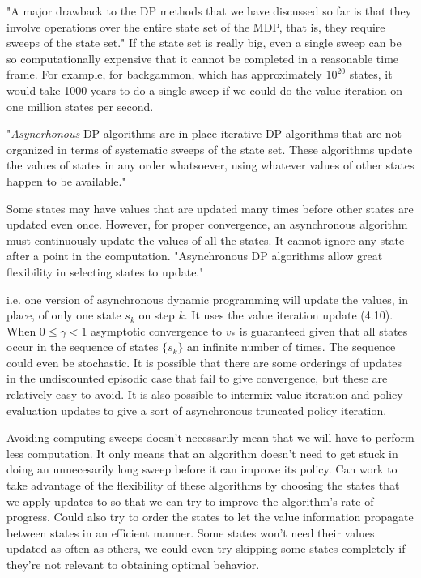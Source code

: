 \documentclass[11pt]{article}
\begin{document}
    "A major drawback to the DP methods that we have discussed so far is
that they involve operations over the entire state set of the MDP, that
is, they require sweeps of the state set." If the state set is really
big, even a single sweep can be so computationally expensive that it
cannot be completed in a reasonable time frame. For example, for
backgammon, which has approximately \(10^20\) states, it would take 1000
years to do a single sweep if we could do the value iteration on one
million states per second.

"\emph{Asyncrhonous} DP algorithms are in-place iterative DP algorithms
that are not organized in terms of systematic sweeps of the state set.
These algorithms update the values of states in any order whatsoever,
using whatever values of other states happen to be available."

Some states may have values that are updated many times before other
states are updated even once. However, for proper convergence, an
asynchronous algorithm must continuously update the values of all the
states. It cannot ignore any state after a point in the computation.
"Asynchronous DP algorithms allow great flexibility in selecting states
to update."

i.e. one version of asynchronous dynamic programming will update the
values, in place, of only one state \(s_k\) on step \(k\). It uses the
value iteration update (4.10). When \(0 \leq \gamma < 1\) asymptotic
convergence to \(v_*\) is guaranteed given that all states occur in the
sequence of states \(\{s_k\}\) an infinite number of times. The sequence
could even be stochastic. It is possible that there are some orderings
of updates in the undiscounted episodic case that fail to give
convergence, but these are relatively easy to avoid. It is also possible
to intermix value iteration and policy evaluation updates to give a sort
of asynchronous truncated policy iteration.

Avoiding computing sweeps doesn't necessarily mean that we will have to
perform less computation. It only means that an algorithm doesn't need
to get stuck in doing an unnecesarily long sweep before it can improve
its policy. Can work to take advantage of the flexibility of these
algorithms by choosing the states that we apply updates to so that we
can try to improve the algorithm's rate of progress. Could also try to
order the states to let the value information propagate between states
in an efficient manner. Some states won't need their values updated as
often as others, we could even try skipping some states completely if
they're not relevant to obtaining optimal behavior.
\end{document}
